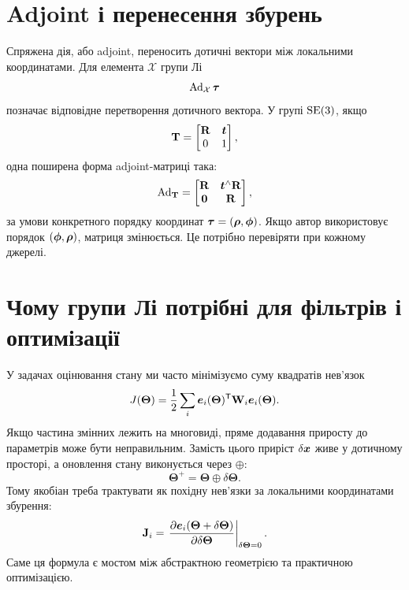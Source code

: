 \section{Adjoint і перенесення збурень}

Спряжена дія, або adjoint, переносить дотичні вектори між локальними координатами. Для елемента $\mathcal{X}$ групи Лі
\begin{equation}
    \operatorname{Ad}_{\mathcal{X}}\bm{\tau}
\end{equation}
позначає відповідне перетворення дотичного вектора. У групі $\mathrm{SE}(3)$, якщо
\begin{equation}
    \mathbf{T}=\begin{bmatrix}\mathbf{R}&\bm{t}\\0&1\end{bmatrix},
\end{equation}
одна поширена форма adjoint-матриці така:
\begin{equation}
    \operatorname{Ad}_{\mathbf{T}}=
    \begin{bmatrix}
        \mathbf{R} & \bm{t}^{\wedge}\mathbf{R}\\
        \mathbf{0} & \mathbf{R}
    \end{bmatrix},
\end{equation}
за умови конкретного порядку координат $\bm{\tau}=(\bm{\rho},\bm{\phi})$. Якщо автор використовує порядок $(\bm{\phi},\bm{\rho})$, матриця змінюється. Це потрібно перевіряти при кожному джерелі.

\section{Чому групи Лі потрібні для фільтрів і оптимізації}

У задачах оцінювання стану ми часто мінімізуємо суму квадратів нев'язок
\begin{equation}
    J(\bm{\Theta}) = \frac{1}{2}\sum_i \bm{e}_i(\bm{\Theta})^{\mathsf{T}} \mathbf{W}_i \bm{e}_i(\bm{\Theta}).
\end{equation}
Якщо частина змінних лежить на многовиді, пряме додавання приросту до параметрів може бути неправильним. Замість цього приріст $\delta\bm{x}$ живе у дотичному просторі, а оновлення стану виконується через $\oplus$:
\begin{equation}
    \bm{\Theta}^{+} = \bm{\Theta}\oplus\delta\bm{\Theta}.
\end{equation}
Тому якобіан треба трактувати як похідну нев'язки за локальними координатами збурення:
\begin{equation}
    \mathbf{J}_i = \left.\frac{\partial \bm{e}_i(\bm{\Theta}+\delta\bm{\Theta})}{\partial\delta\bm{\Theta}}\right|_{\delta\bm{\Theta}=0}.
\end{equation}
Саме ця формула є мостом між абстрактною геометрією та практичною оптимізацією.

